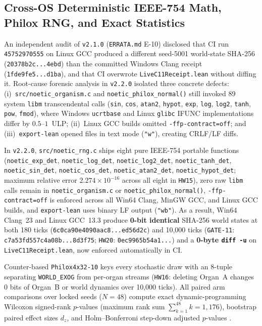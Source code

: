 \documentclass[11pt,reqno]{amsart}
\theoremstyle{remark}
\begin{document}
\subsection{Cross-OS Deterministic IEEE-754 Math, Philox RNG, and Exact Statistics}
\label{subsec:stats}

An independent audit of \texttt{v2.1.0} (\texttt{ERRATA.md} E-10) disclosed that CI run \texttt{45752970555} on Linux GCC produced a different seed-5001 world-state SHA-256 (\texttt{20378b2c...4ebd}) than the committed Windows Clang receipt (\texttt{1fde9fe5...d1ba}), and that CI overwrote \texttt{LiveC11Receipt.lean} without diffing it. Root-cause forensic analysis in \texttt{v2.2.0} isolated three concrete defects: (i)~\texttt{src/noetic\_organism.c} and \texttt{noetic\_philox\_normal()} still invoked 89 system \texttt{libm} transcendental calls (\texttt{sin}, \texttt{cos}, \texttt{atan2}, \texttt{hypot}, \texttt{exp}, \texttt{log}, \texttt{log2}, \texttt{tanh}, \texttt{pow}, \texttt{fmod}), where Windows \texttt{ucrtbase} and Linux \texttt{glibc} IFUNC implementations differ by $0.5$--$1$~ULP; (ii)~Linux GCC builds omitted \texttt{-ffp-contract=off}; and (iii)~\texttt{export-lean} opened files in text mode (\texttt{"w"}), creating CRLF/LF diffs.

In \texttt{v2.2.0}, \texttt{src/noetic\_rng.c} ships eight pure IEEE-754 portable functions (\texttt{noetic\_\allowbreak exp\_det}, \texttt{noetic\_\allowbreak log\_det}, \texttt{noetic\_\allowbreak log2\_det}, \texttt{noetic\_\allowbreak tanh\_det}, \texttt{noetic\_\allowbreak sin\_det}, \texttt{noetic\_\allowbreak cos\_det}, \texttt{noetic\_\allowbreak atan2\_det}, \texttt{noetic\_\allowbreak hypot\_det}; maximum relative error $2.274 \times 10^{-16}$ across all eight in \texttt{HW15}), zero raw \texttt{libm} calls remain in \texttt{noetic\_\allowbreak organism.c} or \texttt{noetic\_\allowbreak philox\_\allowbreak normal()}, \texttt{-ffp-contract=off} is enforced across all Win64 Clang, MinGW GCC, and Linux GCC builds, and \texttt{export-lean} uses binary LF output (\texttt{"wb"}). As a result, Win64 Clang~23 and Linux GCC~13.3 produce \textbf{0-bit identical} SHA-256 world states at both 180 ticks (\nolinkurl{6c0ca90e4090aac8...ed56d2c}) and 10,000 ticks (\texttt{GATE-11}: \nolinkurl{c7a53fd557c4a08b...8d3f75}; \texttt{HW20}: \nolinkurl{0ec9965b54a1...}) and a \textbf{0-byte \texttt{diff -u}} on \texttt{LiveC11Receipt.lean}, now enforced automatically in CI.

Counter-based \texttt{Philox4x32-10} \cite{salmon2011} keys every stochastic draw with an 8-tuple separating \texttt{WORLD\_EXOG} from per-organ streams (\texttt{HW16}: deleting Organ~A changes 0 bits of Organ~B or world dynamics over 10,000 ticks). All paired arm comparisons over locked seeds ($N = 48$) compute exact dynamic-programming Wilcoxon signed-rank $p$-values \cite{wilcoxon1945} (maximum rank sum $\sum_{k=1}^{48} k = 1{,}176$), bootstrap paired effect sizes $d_z$, and Holm--Bonferroni step-down adjusted $p$-values \cite{holm1979}.
\end{document}
